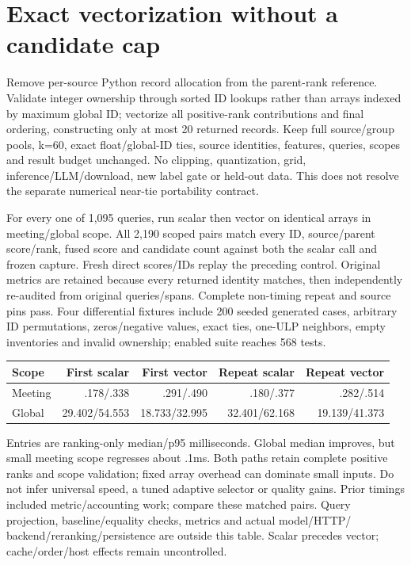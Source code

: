 \documentclass[11pt]{article}
\begin{document}
\section{Exact vectorization without a candidate cap}
Remove per-source Python record allocation from the parent-rank reference.
Validate integer ownership through sorted ID lookups rather than arrays
indexed by maximum global ID; vectorize all positive-rank contributions and
final ordering, constructing only at most 20 returned records. Keep full
source/group pools, k=60, exact float/global-ID ties, source identities,
features, queries, scopes and result budget unchanged. No clipping,
quantization, grid, inference/LLM/download, new label gate or held-out data.
This does not resolve the separate numerical near-tie portability contract.

For every one of 1,095 queries, run scalar then vector on identical arrays in
meeting/global scope. All 2,190 scoped pairs match every ID, source/parent
score/rank, fused score and candidate count against both the scalar call and
frozen capture. Fresh direct scores/IDs replay the preceding control. Original
metrics are retained because every returned identity matches, then independently
re-audited from original queries/spans. Complete non-timing repeat and source
pins pass. Four differential fixtures include 200 seeded generated cases,
arbitrary ID permutations, zeros/negative values, exact ties, one-ULP neighbors,
empty inventories and invalid ownership; enabled suite reaches 568 tests.

\begin{center}
\begin{tabular}{lrrrr}
Scope & First scalar & First vector & Repeat scalar & Repeat vector\\
\hline
Meeting & .178/.338 & .291/.490 & .180/.377 & .282/.514\\
Global & 29.402/54.553 & 18.733/32.995 & 32.401/62.168 & 19.139/41.373\\
\end{tabular}
\end{center}
Entries are ranking-only median/p95 milliseconds. Global median improves,
but small meeting scope regresses about .1ms. Both paths retain complete
positive ranks and scope validation; fixed array overhead can dominate small
inputs. Do not infer universal speed, a tuned adaptive selector or quality gains.
Prior timings included metric/accounting work; compare these matched pairs.
Query projection, baseline/equality checks, metrics and actual model/HTTP/
backend/reranking/persistence are outside this table. Scalar precedes vector;
cache/order/host effects remain uncontrolled.
\end{document}
